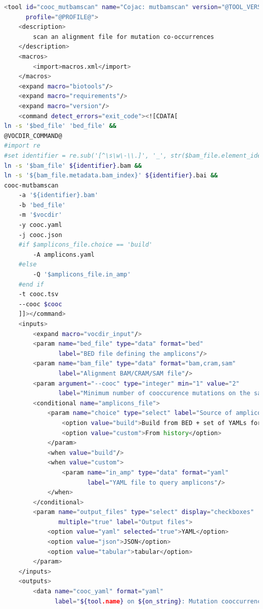 \begin{lstlisting}[language=bash, caption=tool wrapper for Cojac: mutbamscan, label=list:methods:wrapper-cojac-mutbamcsan]
<tool id="cooc_mutbamscan" name="Cojac: mutbamscan" version="@TOOL_VERSION@+galaxy@VERSION_SUFFIX@"
      profile="@PROFILE@">
    <description>
        scan an alignment file for mutation co-occurrences
    </description>
    <macros>
        <import>macros.xml</import>
    </macros>
    <expand macro="biotools"/>
    <expand macro="requirements"/>
    <expand macro="version"/>
    <command detect_errors="exit_code"><![CDATA[
ln -s '$bed_file' 'bed_file' &&
@VOCDIR_COMMAND@
#import re
#set identifier = re.sub('[^\s\w\-\\.]', '_', str($bam_file.element_identifier))
ln -s '$bam_file' ${identifier}.bam &&
ln -s '${bam_file.metadata.bam_index}' ${identifier}.bai &&
cooc-mutbamscan
    -a '${identifier}.bam'
    -b 'bed_file'
    -m '$vocdir'
    -y cooc.yaml
    -j cooc.json
    #if $amplicons_file.choice == 'build'
        -A amplicons.yaml
    #else
        -Q '$amplicons_file.in_amp'
    #end if
    -t cooc.tsv
    --cooc $cooc
    ]]></command>
    <inputs>
        <expand macro="vocdir_input"/>
        <param name="bed_file" type="data" format="bed"
               label="BED file defining the amplicons"/>
        <param name="bam_file" type="data" format="bam,cram,sam"
               label="Alignment BAM/CRAM/SAM file"/>
        <param argument="--cooc" type="integer" min="1" value="2"
               label="Minimum number of cooccurence mutations on the same amplicon"/>
        <conditional name="amplicons_file">
            <param name="choice" type="select" label="Source of amplicons YAML file">
                <option value="build">Build from BED + set of YAMLs for variants of concern</option>
                <option value="custom">From history</option>
            </param>
            <when value="build"/>
            <when value="custom">
                <param name="in_amp" type="data" format="yaml"
                       label="YAML file to query amplicons"/>
            </when>
        </conditional>
        <param name="output_files" type="select" display="checkboxes"
               multiple="true" label="Output files">
            <option value="yaml" selected="true">YAML</option>
            <option value="json">JSON</option>
            <option value="tabular">tabular</option>
        </param>
    </inputs>
    <outputs>
        <data name="cooc_yaml" format="yaml"
              label="${tool.name} on ${on_string}: Mutation cooccurrence (yaml)"

\end{lstlisting}
